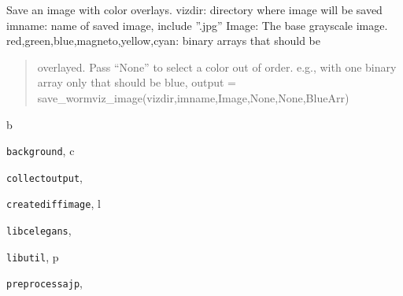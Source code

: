 \documentclass[letterpaper,10pt,oneside]{sphinxmanual}
\begin{document}
\begin{fulllineitems}
\label{index:libcelegans.save_wormviz_image}
Save an image with color overlays.  
vizdir: directory where image will be saved
imname: name of saved image, include ''.jpg''
Image:  The base grayscale image.
red,green,blue,magneto,yellow,cyan:  binary arrays that should be
\begin{quote}

overlayed. Pass ``None'' to select a color out of order.  e.g.,
with one binary array only that should be blue, 
output = save\_wormviz\_image(vizdir,imname,Image,None,None,BlueArr)
\end{quote}

\end{fulllineitems}



\renewcommand{\indexname}{Python Module Index}
\begin{theindex}
\def\bigletter#1{{\Large\sffamily#1}\nopagebreak\vspace{1mm}}
\bigletter{b}
\item {\texttt{background}}, \pageref{index:module-background}
\indexspace
\bigletter{c}
\item {\texttt{collectoutput}}, \pageref{index:module-collectoutput}
\item {\texttt{creatediffimage}}, \pageref{index:module-creatediffimage}
\indexspace
\bigletter{l}
\item {\texttt{libcelegans}}, \pageref{index:module-libcelegans}
\item {\texttt{libutil}}, \pageref{index:module-libutil}
\indexspace
\bigletter{p}
\item {\texttt{preprocessajp}}, \pageref{index:module-preprocessajp}
\end{theindex}

\renewcommand{\indexname}{Index}
\printindex
\end{document}
